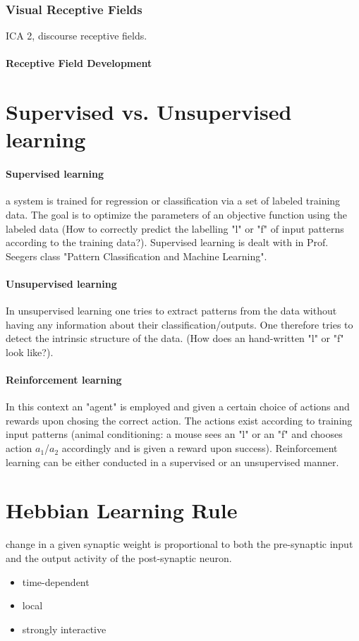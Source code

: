 \documentclass[11pt]{article}
\begin{document}
\subsubsection{Visual Receptive Fields}
ICA 2, discourse receptive fields. 

\paragraph{Receptive Field Development}


\section{Supervised vs. Unsupervised learning}
\paragraph{Supervised learning} a system is trained for regression or classification via a set of labeled training data. The goal is to optimize the parameters of an objective function using the labeled data (How to correctly predict the labelling "l" or "f" of input patterns according to the training data?). Supervised learning is dealt with in Prof. Seegers class "Pattern Classification and Machine Learning".
\paragraph{Unsupervised learning} In unsupervised learning one tries to extract patterns from the data without having any information about their classification/outputs. One therefore tries to detect the intrinsic structure of the data. (How does an hand-written "l" or "f" look like?). 
\paragraph{Reinforcement learning}
In this context an "agent" is employed and given a certain choice of actions and rewards upon chosing the correct action. The actions exist according to training input patterns (animal conditioning: a mouse sees an "l" or an "f" and chooses action $a_1$/$a_2$ accordingly and is given a reward upon success).
Reinforcement learning can be either conducted in a supervised or an unsupervised manner.

\section{Hebbian Learning Rule}
change in a given synaptic weight is proportional to both the pre-synaptic input and the output activity of the post-synaptic neuron.
\begin{itemize}
\item time-dependent
\item local
\item strongly interactive
\end{itemize}
\end{document}
